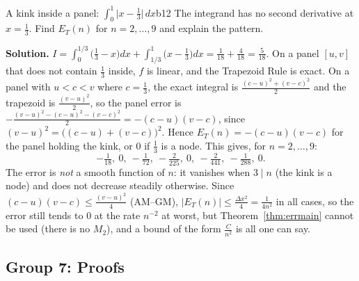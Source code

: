 \documentclass[11pt]{article}
\begin{document}
\begin{exmp}{A kink inside a panel: $\int_0^1\bigl\lvert x-\frac13\bigr\rvert\,dx$}{b12}
The integrand has no second derivative at $x=\frac13$. Find $E_T(n)$ for $n=2,\dots,9$ and explain the pattern.

\textbf{Solution.} $I=\int_0^{1/3}\bigl(\tfrac13-x\bigr)dx+\int_{1/3}^1\bigl(x-\tfrac13\bigr)dx=\frac1{18}+\frac4{18}=\frac5{18}$. On a panel $[u,v]$ that does not contain $\frac13$ inside, $f$ is linear, and the Trapezoid Rule is exact. On a panel with $u<c<v$ where $c=\frac13$, the exact integral is $\frac{(c-u)^2+(v-c)^2}2$ and the trapezoid is $\frac{(v-u)^2}2$, so the panel error is $-\frac{(v-u)^2-(c-u)^2-(v-c)^2}2=-(c-u)(v-c)$, since $(v-u)^2=\bigl((c-u)+(v-c)\bigr)^2$. Hence $E_T(n)=-(c-u)(v-c)$ for the panel holding the kink, or $0$ if $\frac13$ is a node. This gives, for $n=2,\dots,9$:
\[-\tfrac1{18},\ 0,\ -\tfrac1{72},\ -\tfrac2{225},\ 0,\ -\tfrac2{441},\ -\tfrac1{288},\ 0.\]
The error is \emph{not} a smooth function of $n$: it vanishes when $3\mid n$ (the kink is a node) and does not decrease steadily otherwise. Since $(c-u)(v-c)\le\frac{(v-u)^2}4$ (AM--GM), $\lvert E_T(n)\rvert\le\frac{\Delta x^2}4=\frac1{4n^2}$ in all cases, so the error still tends to $0$ at the rate $n^{-2}$ at worst, but Theorem~\ref{thm:errmain} cannot be used (there is no $M_2$), and a bound of the form $\frac C{n^2}$ is all one can say.
\end{exmp}

\subsection*{Group 7: Proofs}
\end{document}
